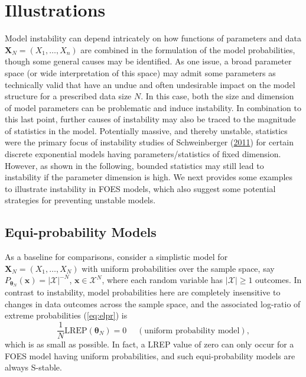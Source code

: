 \documentclass[12pt]{article}
\theoremstyle{definition}
\newcommand{\REP}{\mathrm{LREP}}
\begin{document}
\section{Illustrations}
  Model instability can  depend intricately on how functions of parameters and data $\boldsymbol X_N=(X_1,\ldots,X_n)$ are combined in the formulation of the model probabilities, though some general causes may be identified.  As one issue, a broad parameter space (or wide interpretation of this space) may admit some parameters as technically valid that have an undue and often undesirable  impact   on  the model structure for a prescribed data size $N$.  In this case, both the size and dimension of model parameters can be problematic and induce instability.   In combination to this last point, further causes of instability may also be traced to  the magnitude of statistics in the model.  Potentially massive, and thereby unstable,   statistics were the primary focus
  of instability studies of Schweinberger
(\protect\hyperlink{ref-schweinberger2011instability}{2011}) for certain discrete exponential models having parameters/statistics of fixed dimension.  However, as shown in the following, bounded statistics may still lead to instability if the  parameter dimension is high.
   We next provides some examples to illustrate instability in FOES models, which also suggest  some potential strategies for preventing unstable models.



\subsection{Equi-probability Models}  As a baseline for comparisons, consider a simplistic model for $\boldsymbol X_N=(X_1,\ldots,X_N)$ with uniform probabilities over the sample space, say
$P_{\boldsymbol \theta_N}(\boldsymbol x)= |\mathcal{X}|^{-N}$, $\boldsymbol x \in \mathcal{X}^N$, where each random variable has $|\mathcal{X}| \geq 1$ outcomes.  In contrast to instability, model probabilities here are completely insensitive to changes in data outcomes across the sample space, and the associated log-ratio of extreme probabilities (\ref{eq:elpr}) is
\[
\frac{1}{N} \REP(\boldsymbol \theta_N)=0\quad \;(\mbox{uniform probability model}),
\] which is as small as possible.  In fact, a LREP value of zero can only occur for a FOES model  having uniform probabilities, and such equi-probability models are always S-stable.
\end{document}
